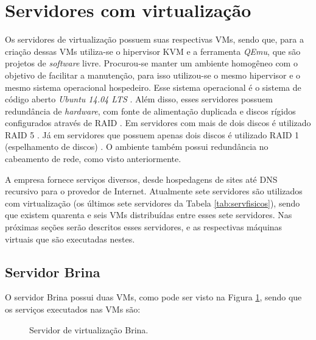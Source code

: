 \section{Servidores com virtualização}
\label{section:servvirt}

Os servidores de virtualização possuem suas respectivas \ac{VM}s, sendo que, para a criação dessas \ac{VM}s utiliza-se o hipervisor \ac{KVM} 
\cite{kvm} e a ferramenta \textit{QEmu}, que são projetos de \textit{software} livre. Procurou-se manter um ambiente homogêneo com o objetivo de 
facilitar a manutenção, para isso utilizou-se o mesmo hipervisor e o mesmo sistema operacional hospedeiro. Esse sistema operacional é o sistema 
de código aberto \textit{Ubuntu 14.04 \ac{LTS}} \cite{ubuntu}. Além disso, esses servidores possuem redundância de \textit{hardware}, com fonte 
de alimentação duplicada e discos rígidos configurados através de \ac{RAID} \cite{raid}. Em servidores com mais de dois discos é utilizado 
\ac{RAID} 5 \cite{raid}. Já em servidores que possuem apenas dois discos é utilizado \ac{RAID} 1 (espelhamento de discos) \cite{raid}. 
O ambiente também possui redundância no cabeamento de rede, como visto anteriormente.

A empresa fornece serviços diversos, desde hospedagens de sites até \ac{DNS} recursivo para o provedor de Internet. Atualmente sete servidores 
são utilizados com virtualização (os últimos sete servidores da Tabela \ref{tab:servfisicos}), sendo que existem quarenta e seis \ac{VM}s 
distribuídas entre esses sete servidores. Nas próximas seções serão descritos esses servidores, e as respectivas máquinas virtuais que são
executadas nestes.

\subsection{Servidor Brina}
\label{section:serv_brina}

O servidor Brina possui duas \ac{VM}s, como pode ser visto na Figura \ref{fig:servidor_brina}, sendo que os serviços executados nas \ac{VM}s são:

\begin{figure}[h!]
 \centering
 \caption{Servidor de virtualização Brina.}
 \label{fig:servidor_brina}
\end{figure}

